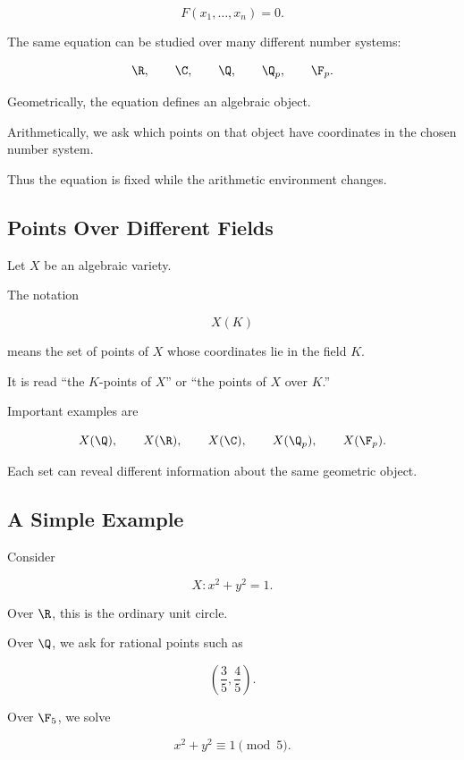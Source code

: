 \[ F(x_1,\ldots,x_n)=0. \]

The same equation can be studied over many different number systems:

\[
\R,\qquad
\C,\qquad
\Q,\qquad
\Q_p,\qquad
\F_p.
\]

Geometrically, the equation defines an algebraic object.

Arithmetically, we ask which points on that object have coordinates in the
chosen number system.

Thus the equation is fixed while the arithmetic environment changes.

\subsection{Points Over Different Fields}
\label{subsec:points-over-different-fields}

Let \(X\) be an algebraic variety.

The notation

\[ X(K) \]

means the set of points of \(X\) whose coordinates lie in the field \(K\).

It is read ``the \(K\)-points of \(X\)'' or ``the points of \(X\) over
\(K\).''

Important examples are

\[
X(\Q),\qquad
X(\R),\qquad
X(\C),\qquad
X(\Q_p),\qquad
X(\F_p).
\]

Each set can reveal different information about the same geometric object.

\subsection{A Simple Example}
\label{subsec:arithmetic-geometry-simple-example}

Consider

\[ X:x^2+y^2=1. \]

Over \(\R\), this is the ordinary unit circle.

Over \(\Q\), we ask for rational points such as

\[ \left(\frac35,\frac45\right). \]

Over \(\F_5\), we solve

\[ x^2+y^2\equiv1\pmod5. \]

